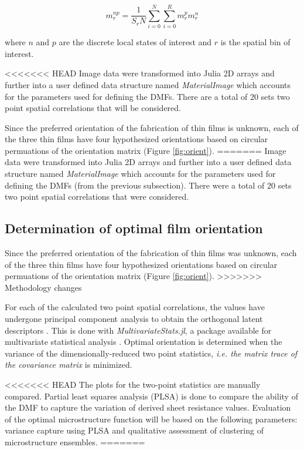 \[
  m^{np}_r = \dfrac{1}{S_rN} \sum_{i=0}^{N} \sum_{i=0}^{R} m^p_r m^n_r
\]

where $n$ and $p$ are the discrete local states of interest and $r$ is the spatial bin of interest.

<<<<<<< HEAD
Image data were transformed into Julia 2D arrays \cite{julia15} and further into a user defined data structure named \emph{MaterialImage} which accounts for the parameters used for defining the DMFs.
There are a total of 20 sets two point spatial correlations that will be considered.

Since the preferred orientation of the fabrication of thin films is unknown, each of the three thin films have four hypothesized orientations based on circular permuations of the orientation matrix (Figure \ref{fig:orient}).
=======
Image data were transformed into Julia 2D arrays \cite{julia15} and further into a user defined data structure named \emph{MaterialImage} which accounts for the parameters used for defining the DMFs (from the previous subsection).
There were a total of 20 sets two point spatial correlations that were considered.

\subsection{Determination of optimal film orientation}
Since the preferred orientation of the fabrication of thin films was unknown, each of the three thin films have four hypothesized orientations based on circular permuations of the orientation matrix (Figure \ref{fig:orient}).
>>>>>>> Methodology changes

For each of the calculated two point spatial correlations, the values have undergone principal component analysis to obtain the orthogonal latent descriptors \cite{gupta15, sun17}.
This is done with \emph{MultivariateStats.jl}, a package available for multivariate statistical analysis \cite{mvstats}.
Optimal orientation is determined when the variance of the dimensionally-reduced two point statistics, \textit{i.e. the matrix trace of the covariance matrix} is minimized.

<<<<<<< HEAD
The plots for the two-point statistics are manually compared.
Partial least squares analysis (PLSA) is done to compare the ability of the DMF to capture the variation of derived sheet resistance values.
Evaluation of the optimal microstructure function will be based on the following parameters: variance capture using PLSA and qualitative assessment of clustering of microstructure ensembles.
=======

